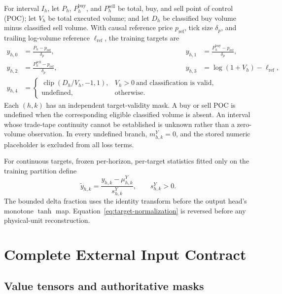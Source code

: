 \documentclass[10pt,letterpaper]{article}
\numberwithin{equation}{section}
\theoremstyle{definition}
\theoremstyle{remark}
\begin{document}
For interval $I_h$, let $P_h$, $P_h^{\mathrm{buy}}$, and
$P_h^{\mathrm{sell}}$ be total, buy, and sell point of control (POC); let
$V_h$ be total executed volume; and let $D_h$ be classified buy volume minus
classified sell volume. With causal reference price $p_{\mathrm{ref}}$, tick
size $\delta_p$, and trailing log-volume reference $\ell_{\mathrm{ref}}$, the
training targets are
\begin{align}
y_{h,0}&=\frac{P_h-p_{\mathrm{ref}}}{\delta_p}, &
y_{h,1}&=\frac{P_h^{\mathrm{buy}}-p_{\mathrm{ref}}}{\delta_p},\nonumber\\
y_{h,2}&=\frac{P_h^{\mathrm{sell}}-p_{\mathrm{ref}}}{\delta_p}, &
y_{h,3}&=\log(1+V_h)-\ell_{\mathrm{ref}},\nonumber\\
y_{h,4}&=
\begin{cases}
\operatorname{clip}\!\left(D_h/V_h,-1,1\right),
  &V_h>0\ \text{and classification is valid},\\
\text{undefined},&\text{otherwise}.
\end{cases}
\label{eq:targets}
\end{align}
Each $(h,k)$ has an independent target-validity mask. A buy or sell POC is
undefined when the corresponding eligible classified volume is absent. An
interval whose trade-tape continuity cannot be established is unknown rather
than a zero-volume observation. In every undefined branch,
\(m^Y_{h,k}=0\), and the stored numeric placeholder is excluded from all loss
terms.

For continuous targets, frozen per-horizon, per-target statistics fitted only
on the training partition define
\begin{equation}
\widetilde y_{h,k}=\frac{y_{h,k}-\mu^Y_{h,k}}{s^Y_{h,k}},
\qquad s^Y_{h,k}>0.
\label{eq:target-normalization}
\end{equation}
The bounded delta fraction uses the identity transform before the output
head's monotone $\tanh$ map. Equation~\eqref{eq:target-normalization} is
reversed before any physical-unit reconstruction.

\section{Complete External Input Contract}

\subsection{Value tensors and authoritative masks}
\end{document}
